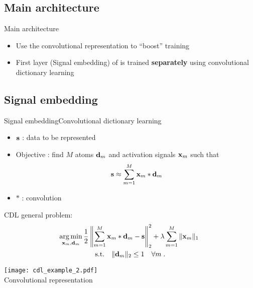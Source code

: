 \subsection{Main architecture}

\begin{frame}{Main architecture}{}

    
\begin{itemize}
    \item Use the convolutional representation to ``boost'' training
    \item First layer (Signal embedding) of \algo is trained \textbf{separately} using convolutional dictionary learning
\end{itemize}
\end{frame}

\subsection{Signal embedding}

\begin{frame}{Signal embedding}{Convolutional dictionary learning}
\begin{minipage}[t]{0.45\linewidth}
    \begin{itemize}
        \item $\mathbf{s}$ : data to be represented
        \item Objective : find $M$ atoms $\mathbf{d}_m$ and activation signals $\mathbf{x}_m$ such that
        $$\mathbf{s} \approx \sum_{m=1}^{M}\mathbf{x}_m * \mathbf{d}_m$$
        \item $*$ : convolution
    \end{itemize}
    \pause[3]
    CDL general problem:
    \begin{gather*}\label{eq:cdl_baseform}
    \operatorname*{arg\,min}_{\mathbf{x}_m,\mathbf{d}_m} \frac{1}{2} \left\| \sum_{m=1}^{M} \mathbf{x}_{m} * \mathbf{d}_m - \mathbf{s} \right\|_2^2 + \lambda \sum_{m=1}^{M} \|\mathbf{x}_m \|_1 \ \\
        \text{s.t.}\quad \| \mathbf{d}_m\|_2 \leq 1 \quad \forall m \;. \nonumber
    \end{gather*}
\end{minipage}\hfill
\begin{minipage}[t]{0.4\linewidth}
    \centering
    \pause[2]
        \centering
        \texttt{[image: cdl\_example\_2.pdf]}\\
        \smallskip
        {\small Convolutional representation}
\end{minipage}

\end{frame}

